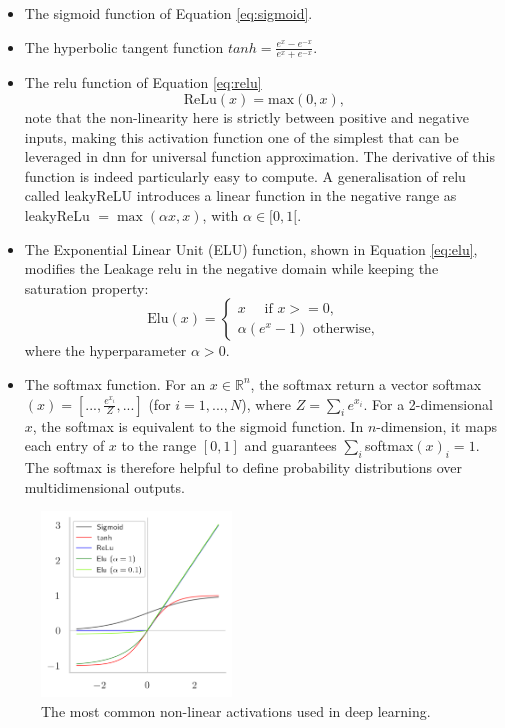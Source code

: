 \begin{itemize}
    \item The sigmoid function of Equation \ref{eq:sigmoid}.
    \item The hyperbolic tangent function $tanh = \frac{e^x - e^{-x}}{e^x + e^{-x}}$.
    \item The \gls{relu} function of Equation \ref{eq:relu}
    \begin{equation}\label{eq:relu}
        \text{ReLu}(x) = \text{max}(0, x),
    \end{equation}
    note that the non-linearity here is strictly between positive and negative inputs, making this activation function one of the simplest that can be leveraged in \gls{dnn} for universal function approximation. The derivative of this function is indeed particularly easy to compute. A generalisation of \gls{relu} called leakyReLU introduces a linear function in the negative range as leakyReLu $= \max(\alpha x, x)$, with $\alpha \in [0, 1[$. 
    \item The Exponential Linear Unit (ELU) function, shown in Equation \ref{eq:elu}, modifies the Leakage \gls{relu} in the negative domain while keeping the saturation property:
    \begin{equation}\label{eq:elu}
        \text{Elu}(x) = 
        \begin{cases}
            x \quad \text{ if } x >= 0, \\
            \alpha (e^x - 1) \text{ otherwise},
        \end{cases}
    \end{equation}
    where the hyperparameter $\alpha > 0$.
    \item The softmax function. For an $x \in \mathbb{R}^n$, the softmax return a vector softmax$(x) = [..., \frac{e^{x_i}}{Z}, ...]$ (for $i= 1, ..., N$), where $Z = \sum_i e^{x_i}$. For a 2-dimensional $x$, the softmax is equivalent to the sigmoid function. In $n$-dimension, it maps each entry of $x$ to the range $[0, 1]$ and guarantees $\sum_i $softmax$(x)_i = 1$. The softmax is therefore  helpful to define probability distributions over multidimensional outputs.
\end{itemize}

\begin{figure}
    \begin{center}
        \includegraphics[width=0.45\textwidth]{Images/ML/activations.png}
        \caption{The most common non-linear activations used in deep learning.} 
        \label{fig:commonAct}
    \end{center}
\end{figure}

